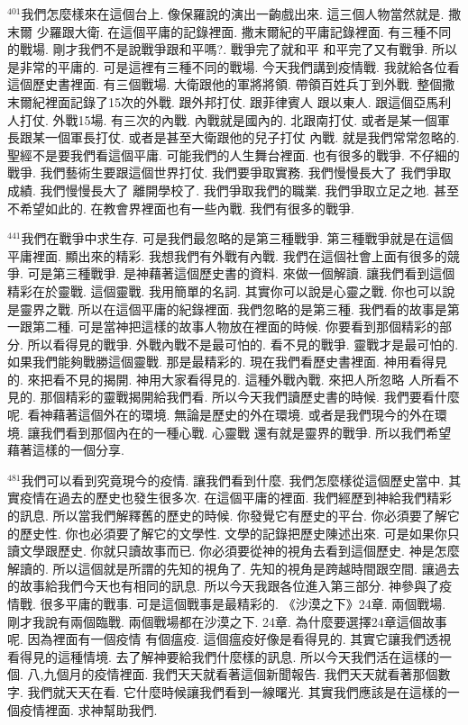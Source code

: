 \documentclass{book}
\begin{document}
$^{401}$我們怎麼樣來在這個台上.
像保羅說的演出一齣戲出來.
這三個人物當然就是.
撒末爾 少羅跟大衛.
在這個平庸的記錄裡面.
撒末爾紀的平庸記錄裡面.
有三種不同的戰場.
剛才我們不是說戰爭跟和平嗎?.
戰爭完了就和平 和平完了又有戰爭.
所以是非常的平庸的.
可是這裡有三種不同的戰場.
今天我們講到疫情戰.
我就給各位看這個歷史書裡面.
有三個戰場.
大衛跟他的軍將將領.
帶領百姓兵丁到外戰.
整個撒末爾紀裡面記錄了15次的外戰.
跟外邦打仗.
跟菲律賓人 跟以東人.
跟這個亞馬利人打仗.
外戰15場.
有三次的內戰.
內戰就是國內的.
北跟南打仗.
或者是某一個軍長跟某一個軍長打仗.
或者是甚至大衛跟他的兒子打仗 內戰.
就是我們常常忽略的.
聖經不是要我們看這個平庸.
可能我們的人生舞台裡面.
也有很多的戰爭.
不仔細的戰爭.
我們藝術生要跟這個世界打仗.
我們要爭取實務.
我們慢慢長大了 我們爭取成績.
我們慢慢長大了 離開學校了.
我們爭取我們的職業.
我們爭取立足之地.
甚至不希望如此的.
在教會界裡面也有一些內戰.
我們有很多的戰爭.

$^{441}$我們在戰爭中求生存.
可是我們最忽略的是第三種戰爭.
第三種戰爭就是在這個平庸裡面.
顯出來的精彩.
我想我們有外戰有內戰.
我們在這個社會上面有很多的競爭.
可是第三種戰爭.
是神藉著這個歷史書的資料.
來做一個解讀.
讓我們看到這個精彩在於靈戰.
這個靈戰.
我用簡單的名詞.
其實你可以說是心靈之戰.
你也可以說是靈界之戰.
所以在這個平庸的紀錄裡面.
我們忽略的是第三種.
我們看的故事是第一跟第二種.
可是當神把這樣的故事人物放在裡面的時候.
你要看到那個精彩的部分.
所以看得見的戰爭.
外戰內戰不是最可怕的.
看不見的戰爭.
靈戰才是最可怕的.
如果我們能夠戰勝這個靈戰.
那是最精彩的.
現在我們看歷史書裡面.
神用看得見的.
來把看不見的揭開.
神用大家看得見的.
這種外戰內戰.
來把人所忽略 人所看不見的.
那個精彩的靈戰揭開給我們看.
所以今天我們讀歷史書的時候.
我們要看什麼呢.
看神藉著這個外在的環境.
無論是歷史的外在環境.
或者是我們現今的外在環境.
讓我們看到那個內在的一種心戰.
心靈戰 還有就是靈界的戰爭.
所以我們希望藉著這樣的一個分享.

$^{481}$我們可以看到究竟現今的疫情.
讓我們看到什麼.
我們怎麼樣從這個歷史當中.
其實疫情在過去的歷史也發生很多次.
在這個平庸的裡面.
我們經歷到神給我們精彩的訊息.
所以當我們解釋舊的歷史的時候.
你發覺它有歷史的平台.
你必須要了解它的歷史性.
你也必須要了解它的文學性.
文學的記錄把歷史陳述出來.
可是如果你只讀文學跟歷史.
你就只讀故事而已.
你必須要從神的視角去看到這個歷史.
神是怎麼解讀的.
所以這個就是所謂的先知的視角了.
先知的視角是跨越時間跟空間.
讓過去的故事給我們今天也有相同的訊息.
所以今天我跟各位進入第三部分.
神參與了疫情戰.
很多平庸的戰事.
可是這個戰事是最精彩的.
《沙漠之下》24章.
兩個戰場.
剛才我說有兩個臨戰.
兩個戰場都在沙漠之下.
24章.
為什麼要選擇24章這個故事呢.
因為裡面有一個疫情 有個瘟疫.
這個瘟疫好像是看得見的.
其實它讓我們透視看得見的這種情境.
去了解神要給我們什麼樣的訊息.
所以今天我們活在這樣的一個.
八,九個月的疫情裡面.
我們天天就看著這個新聞報告.
我們天天就看著那個數字.
我們就天天在看.
它什麼時候讓我們看到一線曙光.
其實我們應該是在這樣的一個疫情裡面.
求神幫助我們.
\end{document}
